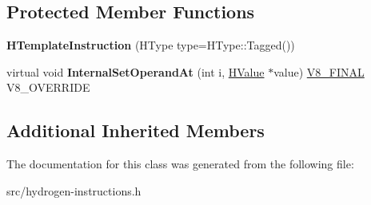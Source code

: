\subsection*{Protected Member Functions}
\begin{DoxyCompactItemize}
\item 
\hypertarget{classv8_1_1internal_1_1_h_template_instruction_a3f74fa24ebbb1ff18db94e4e65f7fefe}{}{\bfseries H\+Template\+Instruction} (H\+Type type=H\+Type\+::\+Tagged())\label{classv8_1_1internal_1_1_h_template_instruction_a3f74fa24ebbb1ff18db94e4e65f7fefe}

\item 
\hypertarget{classv8_1_1internal_1_1_h_template_instruction_a78ffc8dcd6201684010cd0d871584d3a}{}virtual void {\bfseries Internal\+Set\+Operand\+At} (int i, \hyperlink{classv8_1_1internal_1_1_h_value}{H\+Value} $\ast$value) \hyperlink{classv8_1_1internal_1_1_v8___f_i_n_a_l}{V8\+\_\+\+F\+I\+N\+A\+L} V8\+\_\+\+O\+V\+E\+R\+R\+I\+D\+E\label{classv8_1_1internal_1_1_h_template_instruction_a78ffc8dcd6201684010cd0d871584d3a}

\end{DoxyCompactItemize}
\subsection*{Additional Inherited Members}


The documentation for this class was generated from the following file\+:\begin{DoxyCompactItemize}
\item 
src/hydrogen-\/instructions.\+h\end{DoxyCompactItemize}
